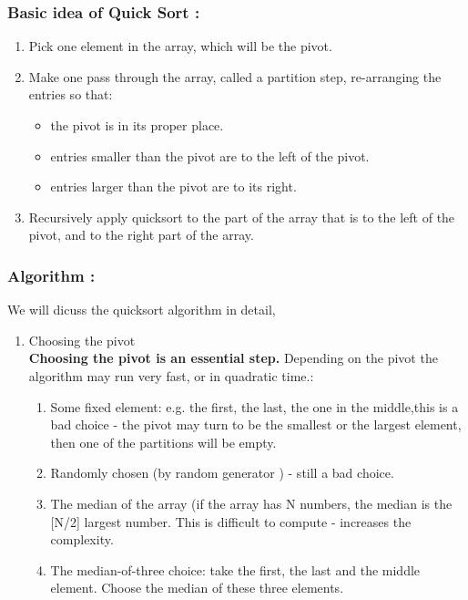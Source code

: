 \documentclass[a4paper,12pt]{article}
\begin{document}
{{		\subsubsection{Basic idea of Quick Sort :}
			\begin{enumerate}
				\item Pick one element in the array, which will be the pivot. 
				\item Make one pass through the array, called a partition step, re-arranging the entries so that: 
					\begin{itemize}
						\item the pivot is in its proper place. 
						\item entries smaller than the pivot are to the left of the pivot. 
						\item entries larger than the pivot are to its right. 
					\end{itemize}
				\item Recursively apply quicksort to the part of the array that is to the left of the pivot, and to the right part of the array. 
			\end{enumerate}
		
		\subsubsection{Algorithm : } We will dicuss the quicksort algorithm in detail,
		
		\begin{enumerate}
			\item Choosing the pivot \\ \textbf{ Choosing the pivot is an essential step.} Depending on the pivot the algorithm may run very fast, or in quadratic time.:
			\begin{enumerate}
				\item  Some fixed element: e.g. the first, the last, the one in the middle,this is a bad choice - the pivot may turn to be the smallest or the largest element, then one of the partitions will be empty.
				\item Randomly chosen (by random generator ) - still a bad choice. 
				\item The median of the array (if the array has N numbers, the median is the [N/2] largest number. This is difficult to compute - increases the complexity. 
				\item The median-of-three choice: take the first, the last and the middle element. Choose the median of these three elements. \\
				

\end{enumerate}
\end{enumerate}}}
\end{document}
